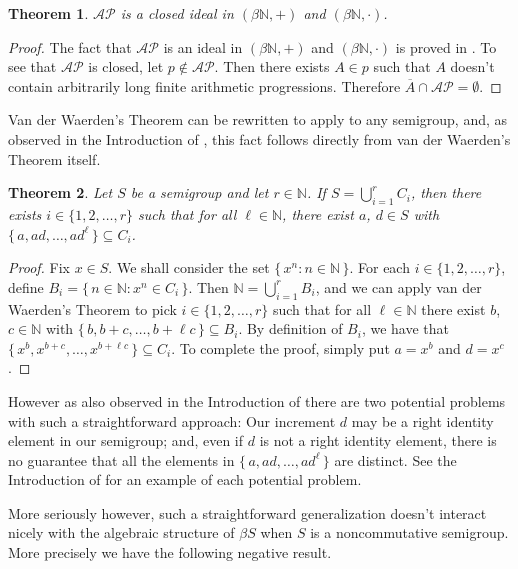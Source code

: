 \documentclass[12pt]{article}
\theoremstyle{plain}
\newtheorem{thm}{Theorem}[section]
\theoremstyle{definition}
\newcommand{\bbN}{\mathbb{N}}
\newcommand{\AP}{\mathcal{AP}}
\begin{document}
\begin{thm}
  $\AP$ is a closed ideal in $(\beta\bbN, +)$ and $(\beta\bbN, \cdot)$.
\end{thm}
\begin{proof}
  The fact that $\AP$ is an ideal in $(\beta\bbN, +)$ and $(\beta\bbN, \cdot)$ is proved in \cite[Theorem 14.5]{Hindman:1998fk}. 
  To see that $\AP$ is closed, let $p \not\in \AP$. 
  Then there exists $A \in p$ such that $A$ doesn't contain arbitrarily long finite arithmetic progressions.
  Therefore $\overline{A} \cap \AP = \emptyset$. 
\end{proof}

Van der Waerden's Theorem can be rewritten to apply to any semigroup, and, as observed in the Introduction of \cite{Bergelson:1992fk}, this fact follows directly from van der Waerden's Theorem itself.

\begin{thm}
  Let $S$ be a semigroup and let $r \in \bbN$.
  If $S = \bigcup_{i=1}^r C_i$, then there exists $i \in \{1, 2, \ldots, r\}$ such that for all $\ell \in \bbN$, there exist $a$, $d \in S$ with $\{\, a , ad, \ldots, ad^\ell \,\} \subseteq C_i$. 
\end{thm}
\begin{proof}
  Fix $x \in S$.
  We shall consider the set $\{\, x^n : n \in \bbN \,\}$.
  For each $i \in \{1, 2, \ldots, r\}$, define $B_i = \{\, n \in \bbN : x^n \in C_i \,\}$.
  Then $\bbN = \bigcup_{i=1}^r B_i$, and we can apply van der Waerden's Theorem to pick $i \in \{1, 2, \ldots, r\}$ such that for all $\ell \in \bbN$ there exist $b$, $c \in \bbN$ with $\{\, b, b+c,
  \ldots, b+\ell c \,\} \subseteq B_i$. 
  By definition of $B_i$, we have that $\{\, x^b, x^{b+c}, \ldots, x^{b+ \ell c} \,\} \subseteq C_i$. 
  To complete the proof, simply put $a = x^b$ and $d = x^c$. 
\end{proof}

However as also observed in the Introduction of \cite{Bergelson:1992fk} there are two potential problems with such a straightforward approach:
Our increment $d$ may be a right identity element in our semigroup; and, even if $d$ is not a right identity element, there is no guarantee that all the elements in $\{\, a, ad, \ldots, ad^{\ell} \,\}$ are distinct. 
See the Introduction of \cite{Bergelson:1992fk} for an example of
each potential problem.

More seriously however, such a straightforward generalization doesn't interact nicely with the algebraic structure of $\beta S$ when $S$ is a noncommutative semigroup.
More precisely we have the following negative result.
\end{document}
